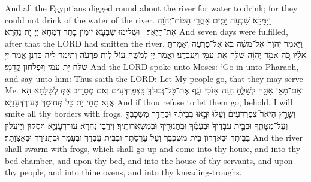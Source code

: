 {{And all the Egyptians digged round about the river for water to drink; for they could not drink of the water of the river.}{}
{וַיִּמָּלֵ֖א שִׁבְעַ֣ת יָמִ֑ים אַחֲרֵ֥י הַכּוֹת־יְהֹוָ֖ה אֶת־הַיְאֹֽר׃ \petucha 
{}}
{וּשְׁלִימוּ שִׁבְעָא יוֹמִין בָּתַר דִּמְחָא יְיָ יָת נַהְרָא׃}
{And seven days were fulfilled, after that the LORD had smitten the river.}{}
{וַיֹּ֤אמֶר יְהֹוָה֙ אֶל־מֹשֶׁ֔ה בֹּ֖א אֶל־פַּרְעֹ֑ה וְאָמַרְתָּ֣ אֵלָ֗יו כֹּ֚ה אָמַ֣ר יְהֹוָ֔ה שַׁלַּ֥ח אֶת־עַמִּ֖י וְיַֽעַבְדֻֽנִי׃}
{וַאֲמַר יְיָ לְמֹשֶׁה עוֹל לְוָת פַּרְעֹה וְתֵימַר לֵיהּ כִּדְנָן אֲמַר יְיָ שַׁלַּח יָת עַמִּי וְיִפְלְחוּן קֳדָמָי׃}
{And the LORD spoke unto Moses: ‘Go in unto Pharaoh, and say unto him: Thus saith the LORD: Let My people go, that they may serve Me.}{}
{וְאִם־מָאֵ֥ן אַתָּ֖ה לְשַׁלֵּ֑חַ הִנֵּ֣ה אָנֹכִ֗י נֹגֵ֛ף אֶת־כׇּל־גְּבוּלְךָ֖ בַּֽצְפַרְדְּעִֽים׃
}
{וְאִם מְסָרֵיב אַתְּ לְשַׁלָּחָא הָא אֲנָא מָחֵי יָת כָּל תְּחוּמָךְ בְּעוּרְדְּעָנַיָּא׃}
{And if thou refuse to let them go, behold, I will smite all thy borders with frogs.}{}
{וְשָׁרַ֣ץ הַיְאֹר֮ צְפַרְדְּעִים֒ וְעָלוּ֙ וּבָ֣אוּ בְּבֵיתֶ֔ךָ וּבַחֲדַ֥ר מִשְׁכָּבְךָ֖ וְעַל־מִטָּתֶ֑ךָ וּבְבֵ֤ית עֲבָדֶ֙יךָ֙ וּבְעַמֶּ֔ךָ וּבְתַנּוּרֶ֖יךָ וּבְמִשְׁאֲרוֹתֶֽיךָ׃
}
{וִירַבֵּי נַהְרָא עוּרְדְּעָנַיָּא וְיִסְּקוּן וְיֵיעֲלוּן בְּבֵיתָךְ וּבְאִדְּרוֹן בֵּית מִשְׁכְּבָךְ וְעַל עַרְסָתָךְ וּבְבֵית עַבְדָךְ וּבְעַמָּךְ וּבְתַנּוּרָךְ וּבְאָצְוָתָךְ׃}
{And the river shall swarm with frogs, which shall go up and come into thy house, and into thy bed-chamber, and upon thy bed, and into the house of thy servants, and upon thy people, and into thine ovens, and into thy kneading-troughs.}{}
}
